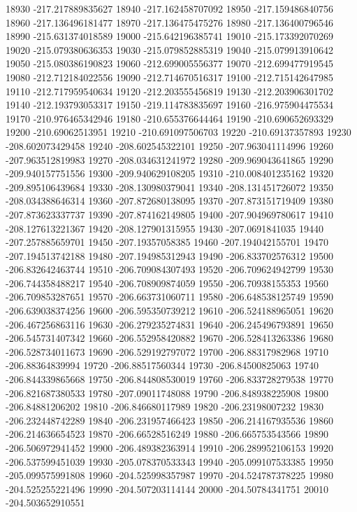 {18930 -217.217889835627
18940 -217.162458707092
18950 -217.159486840756
18960 -217.136496181477
18970 -217.136475475276
18980 -217.136400796546
18990 -215.631374018589
19000 -215.642196385741
19010 -215.173392070269
19020 -215.079380636353
19030 -215.079852885319
19040 -215.079913910642
19050 -215.080386190823
19060 -212.699005556377
19070 -212.699477919545
19080 -212.712184022556
19090 -212.714670516317
19100 -212.715142647985
19110 -212.717959540634
19120 -212.203555456819
19130 -212.203906301702
19140 -212.193793053317
19150 -219.114783835697
19160 -216.975904475534
19170 -210.976465342946
19180 -210.655376644464
19190 -210.690652693329
19200 -210.69062513951
19210 -210.691097506703
19220 -210.69137357893
19230 -208.602073429458
19240 -208.602545322101
19250 -207.963041114996
19260 -207.963512819983
19270 -208.034631241972
19280 -209.969043641865
19290 -209.940157751556
19300 -209.940629108205
19310 -210.008401235162
19320 -209.895106439684
19330 -208.130980379041
19340 -208.131451726072
19350 -208.034388646314
19360 -207.872680138095
19370 -207.873151719409
19380 -207.873623337737
19390 -207.874162149805
19400 -207.904969780617
19410 -208.127613221367
19420 -208.127901315955
19430 -207.0691841035
19440 -207.257885659701
19450 -207.19357058385
19460 -207.194042155701
19470 -207.194513742188
19480 -207.194985312943
19490 -206.833702576312
19500 -206.832642463744
19510 -206.709084307493
19520 -206.709624942799
19530 -206.744358488217
19540 -206.708909874059
19550 -206.70938155353
19560 -206.709853287651
19570 -206.663731060711
19580 -206.648538125749
19590 -206.639038374256
19600 -206.595350739212
19610 -206.524188965051
19620 -206.467256863116
19630 -206.279235274831
19640 -206.245496793891
19650 -206.545731407342
19660 -206.552958420882
19670 -206.528413263386
19680 -206.528734011673
19690 -206.529192797072
19700 -206.88317982968
19710 -206.88364839994
19720 -206.88517560344
19730 -206.84500825063
19740 -206.844339865668
19750 -206.844808530019
19760 -206.833728279538
19770 -206.821687380533
19780 -207.09011748088
19790 -206.848938225908
19800 -206.84881206202
19810 -206.846680117989
19820 -206.23198007232
19830 -206.232448742289
19840 -206.231957466423
19850 -206.214167935536
19860 -206.214636654523
19870 -206.66528516249
19880 -206.665753543566
19890 -206.506972941452
19900 -206.489382363914
19910 -206.289952106153
19920 -206.537599451039
19930 -205.078370533343
19940 -205.099107533385
19950 -205.099575991808
19960 -204.525998357987
19970 -204.524787378225
19980 -204.525255221496
19990 -204.507203114144
20000 -204.50784341751
20010 -204.503652910551
}
